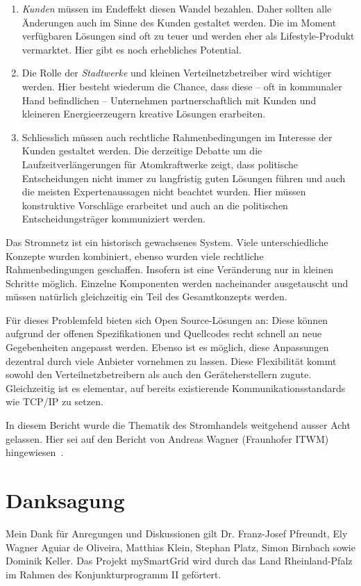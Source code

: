 \documentclass[logo]{fhgart}
\begin{document}
\begin{enumerate}
  \item \emph{Kunden} müssen im Endeffekt diesen Wandel bezahlen. Daher
    sollten alle Änderungen auch im Sinne des Kunden gestaltet werden.
    Die im Moment verfügbaren Lösungen sind oft zu teuer und werden eher
    als Lifestyle-Produkt vermarktet. Hier gibt es noch erhebliches
    Potential.
  \item Die Rolle der \emph{Stadtwerke} und kleinen Verteilnetzbetreiber
    wird wichtiger werden. Hier besteht wiederum die Chance, dass diese
    -- oft in kommunaler Hand befindlichen -- Unternehmen
    partnerschaftlich mit Kunden und kleineren Energieerzeugern kreative
    Lösungen erarbeiten.
  \item Schliesslich müssen auch rechtliche Rahmenbedingungen im
    Interesse der Kunden gestaltet werden. Die derzeitige Debatte um die
    Laufzeitverlängerungen für Atomkraftwerke zeigt, dass politische
    Entscheidungen nicht immer zu langfristig guten Lösungen führen und
    auch die meisten Expertenaussagen nicht beachtet wurden. Hier müssen
    konstruktive Vorschläge erarbeitet und auch an die politischen
    Entscheidungsträger kommuniziert werden.
\end{enumerate}

Das Stromnetz ist ein historisch gewachsenes System. Viele
unterschiedliche Konzepte wurden kombiniert, ebenso wurden viele
rechtliche Rahmenbedingungen geschaffen. Insofern ist eine Veränderung
nur in kleinen Schritte möglich. Einzelne Komponenten werden
nacheinander ausgetauscht und müssen natürlich gleichzeitig ein Teil des
Gesamtkonzepts werden.

Für dieses Problemfeld bieten sich Open Source-Lösungen an: Diese können
aufgrund der offenen Spezifikationen und Quellcodes recht schnell an
neue Gegebenheiten angepasst werden. Ebenso ist es möglich, diese
Anpassungen dezentral durch viele Anbieter vornehmen zu lassen. Diese
Flexibilität kommt sowohl den Verteilnetzbetreibern als auch den
Geräteherstellern zugute. Gleichzeitig ist es elementar, auf bereits
existierende Kommunikationsstandards wie TCP/IP zu setzen.

In diesem Bericht wurde die Thematik des Stromhandels weitgehend
ausser Acht gelassen. Hier sei auf den Bericht von Andreas Wagner
(Fraunhofer ITWM) hingewiesen~\cite{wagner11market}.

\section*{Danksagung}\label{danksagung}
Mein Dank für Anregungen und Diskussionen gilt Dr. Franz-Josef Pfreundt,
Ely Wagner Aguiar de Oliveira, Matthias Klein, Stephan Platz, Simon
Birnbach sowie Dominik Keller. Das Projekt mySmartGrid wird durch das
Land Rheinland-Pfalz im Rahmen des Konjunkturprogramm II geförtert.



\end{document}
